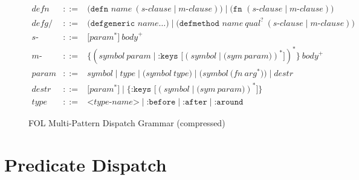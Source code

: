 \documentclass[sigconf,nonacm]{acmart}
\begin{document}
\begin{figure}[htbp]
\centering
\small
$\begin{array}{rcl}
\textit{defn} & ::= & \texttt{(defn } \textit{name} ~ (\textit{s-clause} \mid \textit{m-clause}) \texttt{)} \mid \texttt{(fn } (\textit{s-clause} \mid \textit{m-clause}) \texttt{)} \\
\textit{defg/m} & ::= & \texttt{(defgeneric } \textit{name} \dots \texttt{)} \mid \texttt{(defmethod } \textit{name} ~ \textit{qual}^? ~ (\textit{s-clause} \mid \textit{m-clause}) \texttt{)} \\
\textit{s-clause}& ::= & \texttt{[} \textit{param}^* \texttt{]} ~ \textit{body}^+ \\
\textit{m-clause}& ::= & \texttt{\{} (\textit{symbol} ~ \textit{param} \mid \texttt{:keys~[} (\textit{symbol} \mid \texttt{(} \textit{sym} ~ \textit{param} \texttt{)})^* \texttt{]})^* \texttt{\}} ~ \textit{body}^+ \\
\textit{param} & ::= & \textit{symbol} \mid \textit{type} \mid \texttt{(} \textit{symbol} ~ \textit{type} \texttt{)} \mid \texttt{(} \textit{symbol} ~ \texttt{(} \textit{fn} ~ \textit{arg}^* \texttt{)} \texttt{)} \mid \textit{destr} \\
\textit{destr} & ::= & \texttt{[} \textit{param}^* \texttt{]} \mid \texttt{\{} \texttt{:keys~[} (\textit{symbol} \mid \texttt{(} \textit{sym} ~ \textit{param} \texttt{)})^* \texttt{]} \texttt{\}} \\
\textit{type} & ::= & \texttt{<}\textit{type-name}\texttt{>} \mid \texttt{:before} \mid \texttt{:after} \mid \texttt{:around}
\end{array}$
\caption{FOL Multi-Pattern Dispatch Grammar (compressed)}
\label{fig:grammar}
\end{figure}

\section{Predicate Dispatch}
\label{sec:dispatch}
\end{document}
